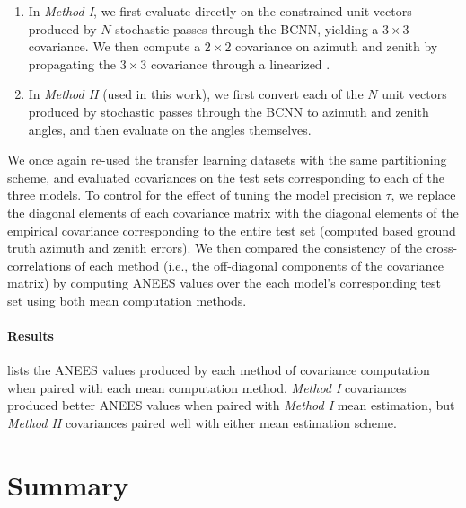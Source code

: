 \begin{enumerate} 
\item In \emph{Method I}, we first evaluate  directly on the constrained unit vectors produced by $N$ stochastic passes through the BCNN, yielding a $3 \times 3$ covariance. 
We then compute a $2 \times 2$ covariance on azimuth and zenith by propagating the $3 \times 3$ covariance through a linearized .

\item In \emph{Method II} (used in this work), we first convert each of the $N$ unit vectors produced by stochastic passes through the BCNN to azimuth and zenith angles, and then evaluate  on the angles themselves.
\end{enumerate}

We once again re-used the transfer learning datasets with the same partitioning scheme, and evaluated covariances on the test sets corresponding to each of the three models. 
To control for the effect of tuning the model precision $\tau$, we replace the diagonal elements of each covariance matrix with the diagonal elements of the empirical covariance corresponding to the entire test set (computed based ground truth azimuth and zenith errors). 
We then compared the consistency of the cross-correlations of each method (i.e., the off-diagonal components of the covariance matrix) by computing ANEES values over the each model's corresponding test set using both mean computation methods.  



\paragraph{Results}
 lists the ANEES values produced by each method of covariance computation when paired with each mean computation method. 
\emph{Method I} covariances produced better ANEES values when paired with \emph{Method I} mean estimation, but \emph{Method II} covariances paired well with either mean estimation scheme. 



\section{Summary}


